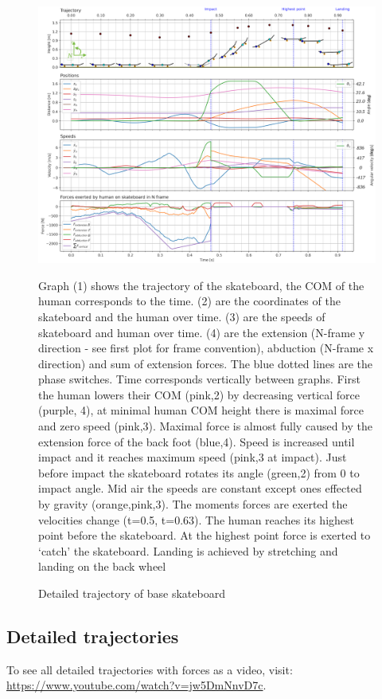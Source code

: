 \documentclass[default,iicol]{sn-jnl}
\begin{document}
\begin{figure}
    \centering
    \includegraphics[trim={0cm 0cm 0cm 0cm},clip,width=\textwidth]{paper/figure/Results/data_basedpi600 (1).png}
    \caption[Trajectory, positions, speeds, and forces of base optimization]{\foot
    Detailed trajectory of base skateboard}\label{f_noparameter}
    Graph (1) shows the trajectory of the skateboard, the COM of the human corresponds to the time. (2) are the coordinates of the skateboard and the human over time. (3) are the speeds of skateboard and human over time. (4) are the extension (N-frame y direction - see first plot for frame convention), abduction (N-frame x direction) and sum of extension forces. The blue dotted lines are the phase switches. Time corresponds vertically between graphs. First the human lowers their COM (pink,2) by decreasing vertical force (purple, 4), at minimal human COM height there is maximal force and zero speed (pink,3). Maximal force is almost fully caused by the extension force of the back foot (blue,4). Speed is increased until impact and it reaches maximum speed (pink,3 at impact). Just before impact the skateboard rotates its angle (green,2) from 0 to impact angle. Mid air the speeds are constant except ones effected by gravity (orange,pink,3). The moments forces are exerted the velocities change (t=0.5, t=0.63). The human reaches its highest point before the skateboard. At the highest point force is exerted to `catch' the skateboard. Landing is achieved by stretching and landing on the back wheel
\end{figure}

\subsection{Detailed trajectories}
To see all detailed trajectories with forces as a video, visit: \url{https://www.youtube.com/watch?v=jw5DmNnvD7c}. 
\end{document}
